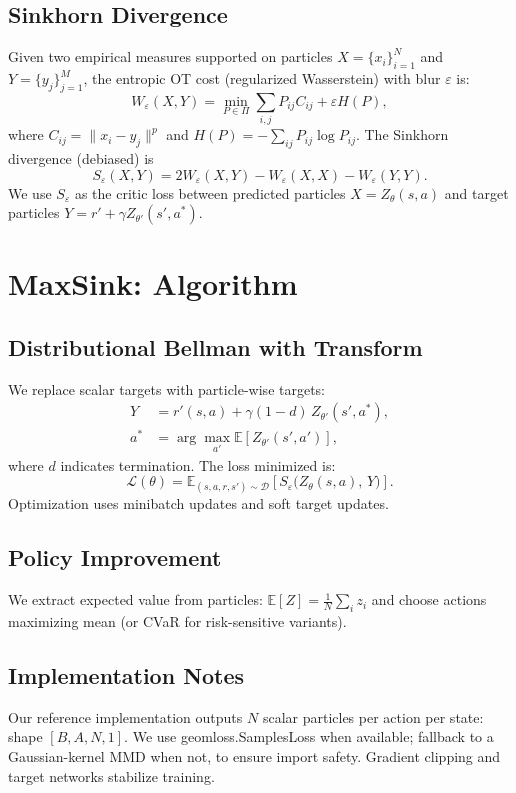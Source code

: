 \documentclass{article}
\begin{document}
\subsection{Sinkhorn Divergence}
Given two empirical measures supported on particles $X=\{x_i\}_{i=1}^N$ and $Y=\{y_j\}_{j=1}^M$, the entropic OT cost (regularized Wasserstein) with blur $\varepsilon$ is:
\begin{equation}
W_\varepsilon(X,Y) = \min_{P\in\Pi}\sum_{i,j} P_{ij}C_{ij} + \varepsilon H(P),
\end{equation}
where $C_{ij}=\|x_i-y_j\|^p$ and $H(P)=-\sum_{ij}P_{ij}\log P_{ij}$. The Sinkhorn divergence (debiased) is
\begin{equation}
S_\varepsilon(X,Y) = 2W_\varepsilon(X,Y) - W_\varepsilon(X,X) - W_\varepsilon(Y,Y).
\label{eq:sinkhorn}
\end{equation}
We use $S_\varepsilon$ as the critic loss between predicted particles $X=Z_\theta(s,a)$ and target particles $Y=r' + \gamma Z_{\theta'}(s',a^*)$.

\section{MaxSink: Algorithm}
\subsection{Distributional Bellman with Transform}
We replace scalar targets with particle-wise targets:
\begin{align}
Y &= r'(s,a) + \gamma (1-d)\, Z_{\theta'}(s', a^*),\\
a^*&=\arg\max_{a'}\mathbb{E}[Z_{\theta'}(s',a')],
\end{align}
where $d$ indicates termination. The loss minimized is:
\begin{equation}
\mathcal{L}(\theta) = \mathbb{E}_{(s,a,r,s')\sim\mathcal{D}}\left[S_\varepsilon\big(Z_\theta(s,a),\,Y\big)\right].
\end{equation}
Optimization uses minibatch updates and soft target updates.

\subsection{Policy Improvement}
We extract expected value from particles: $\mathbb{E}[Z]=\frac{1}{N}\sum_i z_i$ and choose actions maximizing mean (or CVaR for risk-sensitive variants).

\subsection{Implementation Notes}
Our reference implementation outputs $N$ scalar particles per action per state: shape $[B,A,N,1]$. We use geomloss.SamplesLoss when available; fallback to a Gaussian-kernel MMD when not, to ensure import safety. Gradient clipping and target networks stabilize training.
\end{document}
